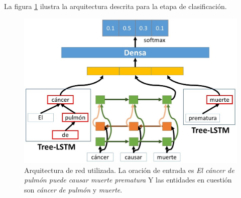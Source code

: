 La figura \ref{fig:rel_model} ilustra la arquitectura descrita para la etapa de clasificación.

\begin{figure}[h!]
	\centering
	\includegraphics[width=1\linewidth]{Graphics/rel_model_class.jpg}
	\caption{Arquitectura de red utilizada. La oración de entrada es \textit{El cáncer de pulmón puede causar muerte prematura} Y las entidades en cuestión son \textit{cáncer de pulmón} y \textit{muerte}.}\label{fig:rel_model}
\end{figure}


